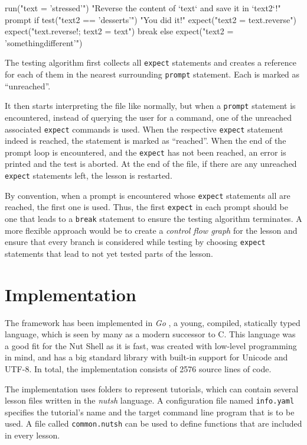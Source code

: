 \documentclass[paper=a4,twoside,abstract=on,cleardoublepage=empty,numbers=noenddot,toc=bib,12pt,appendixprefix=true]{scrreprt}
\begin{document}
\begin{nutsh}
run("text = 'stressed'")
"Reverse the content of `text` and save it in `text2`!"
prompt {
    if test("text2 == 'desserts'") {
        "You did it!"
        expect("text2 = text.reverse")
        expect("text.reverse!; text2 = text")
        break
    } else {
        expect("text2 = 'somethingdifferent'")
    }
}
\end{nutsh}

The testing algorithm first collects all \texttt{expect} statements and creates a reference for each of them in the nearest surrounding \texttt{prompt} statement. Each is marked as “unreached”.

It then starts interpreting the file like normally, but when a \texttt{prompt} statement is encountered, instead of querying the user for a command, one of the unreached associated \texttt{expect} commands is used. When the respective \texttt{expect} statement indeed is reached, the statement is marked as “reached”. When the end of the prompt loop is encountered, and the \texttt{expect} has not been reached, an error is printed and the test is aborted. At the end of the file, if there are any unreached \texttt{expect} statements left, the lesson is restarted.

By convention, when a prompt is encountered whose \texttt{expect} statements all are reached, the first one is used. Thus, the first \texttt{expect} in each prompt should be one that leads to a \texttt{break} statement to ensure the testing algorithm terminates. A more flexible approach would be to create a \emph{control flow graph} for the lesson and ensure that every branch is considered while testing by choosing \texttt{expect} statements that lead to not yet tested parts of the lesson.

\chapter{Implementation}
\label{sec:implementation}

The framework has been implemented in \emph{Go} \cite{google13}, a young, compiled, statically typed language, which is seen by many as a modern successor to C. This language was a good fit for the Nut Shell as it is fast, was created with low-level programming in mind, and has a big standard library with built-in support for Unicode and UTF-8. In total, the implementation consists of 2576 source lines of code.

The implementation uses folders to represent tutorials, which can contain several lesson files written in the \emph{nutsh} language. A configuration file named \texttt{info.yaml} specifies the tutorial's name and the target command line program that is to be used. A file called \texttt{common.nutsh} can be used to define functions that are included in every lesson.
\end{document}
